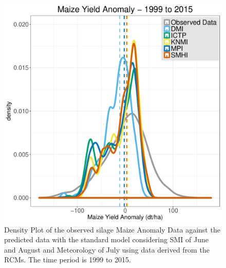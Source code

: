 \documentclass[12pt]{iopart}
\begin{document}
\begin{figure}
	\label{density:2f}
	\centering
	\includegraphics[width=1\textwidth]{figures/Density_Climate_1999-2015_RCMs.pdf}
	\caption{Density Plot of the observed silage Maize Anomaly Data against the predicted data with the standard model considering SMI of June and August and
		Meteorology of July using data derived from the RCMs. The time period is 1999 to 2015.}
\end{figure}



\end{document}
